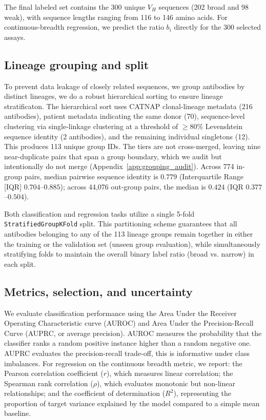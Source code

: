 The final labeled set contains the 300 unique $V_H$ sequences (202 broad and 98
weak), with sequence lengths ranging from 116 to 146 amino acids.
For continuous-breadth regression, we predict the ratio $b_i$ directly for
the 300 selected assays.

\subsection{Lineage grouping and split}

To prevent data leakage of closely related sequences,
we group antibodies by distinct lineages, we do a robust 
hierarchical sorting to
ensure lineage stratificaton. The hierarchical sort uses
CATNAP clonal-lineage metadata (216 antibodies), patient
metadata indicating the same donor (70), sequence-level clustering via
single-linkage clustering at a threshold of $\geq 80\%$ Levenshtein sequence
identity (2 antibodies), and the remaining individual singletons (12). This
produces 113 unique group IDs. The tiers are not cross-merged, leaving nine
near-duplicate pairs that span a group boundary, which we audit but
intentionally do not merge (Appendix~\ref{app:grouping_audit}).
Across 774 in-group pairs, median pairwise
sequence identity is $0.779$ (Interquartile Range [IQR] $0.704$--$0.885$);
across 44,076 out-group pairs, the median is $0.424$ (IQR $0.377$--$0.504$).

Both classification and regression tasks utilize a single 5-fold
\texttt{StratifiedGroupKFold} split. This partitioning scheme guarantees that
all antibodies belonging to any of the 113 lineage groups remain together in
either the training or the validation set (unseen group evaluation), while
simultaneously stratifying folds to maintain the overall binary label ratio
(broad vs. narrow) in each split.

\subsection{Metrics, selection, and uncertainty}

We evaluate classification performance using the Area Under the Receiver
Operating Characteristic curve (AUROC) and Area Under the Precision-Recall Curve
(AUPRC, or average precision). AUROC measures the probability that the
classifier ranks a random positive instance higher than a random negative one.
AUPRC evaluates the precision-recall trade-off, this is informative
under class imbalances. For regression on the continuous breadth metric,
we report: the
Pearson correlation coefficient ($r$), which measures linear correlation; the
Spearman rank correlation ($\rho$), which evaluates monotonic but non-linear
relationships; and the coefficient of determination ($R^2$), representing the
proportion of target variance explained by the model compared to a simple mean
baseline.


